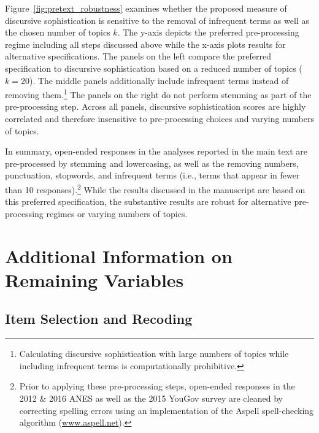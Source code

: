 Figure~\ref{fig:pretext_robustness} examines whether the proposed measure of discursive sophistication is sensitive to the removal of infrequent terms as well as the chosen number of topics $k$. The y-axis depicts the preferred pre-processing regime including all steps discussed above while the x-axis plots results for alternative specifications. The panels on the left compare the preferred specification to discursive sophistication based on a reduced number of topics ($k=20$). The middle panels additionally include infrequent terms instead of removing them.\footnote{Calculating discursive sophistication with large numbers of topics while including infrequent terms is computationally prohibitive.} The panels on the right do not perform stemming as part of the pre-processing step. Across all panels, discursive sophistication scores are highly correlated and therefore insensitive to pre-processing choices and varying numbers of topics.

In summary, open-ended responses in the analyses reported in the main text are pre-processed by stemming and lowercasing, as well as the removing numbers, punctuation, stopwords, and infrequent terms (i.e., terms that appear in fewer than 10 responses).\footnote{Prior to applying these pre-processing steps, open-ended responses in the 2012 \& 2016 ANES as well as the 2015 YouGov survey are cleaned by correcting spelling errors using an implementation of the Aspell spell-checking algorithm (\url{www.aspell.net}).} While the results discussed in the manuscript are based on this preferred specification, the substantive results are robust for alternative pre-processing regimes or varying numbers of topics.


\clearpage
\section{Additional Information on Remaining Variables}\label{app:variables}

\subsection{Item Selection and Recoding}

